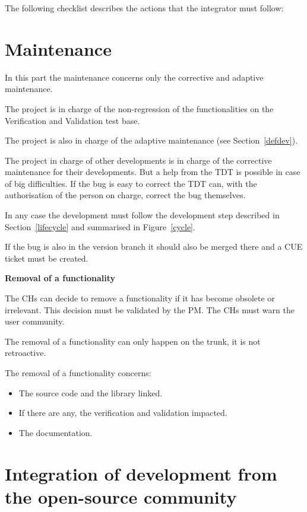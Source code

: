 The following checklist describes the actions that the integrator must follow:


\section{Maintenance}

In this part the maintenance concerns only the corrective and adaptive maintenance.

The \telemacsystem{} project is in charge of the non-regression of the
\telemacsystem{} functionalities on the Verification and Validation test base.

The \telemacsystem{} project is also in charge of the adaptive maintenance (see
Section~\ref{defdev}).

The project in charge of other developments is in charge of the corrective
maintenance for their developments. But a help from the TDT is possible in
case of big difficulties. If the bug is easy to correct the TDT can, with the
authorisation of the person on charge, correct the bug themselves.

In any case the development must follow the development step described in
Section~\ref{lifecycle} and summarised in Figure~\ref{cycle}.

If the bug is also in the version branch it should also be merged there and a CUE
ticket must be created.

\textbf{Removal of a functionality}

The CHs can decide to remove a functionality if it has become obsolete or
irrelevant. This decision must be validated by the PM\@. The CHs must warn the
user community.

The removal of a functionality can only happen on the trunk, it is not
retroactive.

The removal of a functionality concerns:
\begin{itemize}
\item The source code and the library linked.
\item If there are any, the verification and validation impacted.
\item The documentation.
\end{itemize}

\section{Integration of development from the open-source community}
\label{devint}

